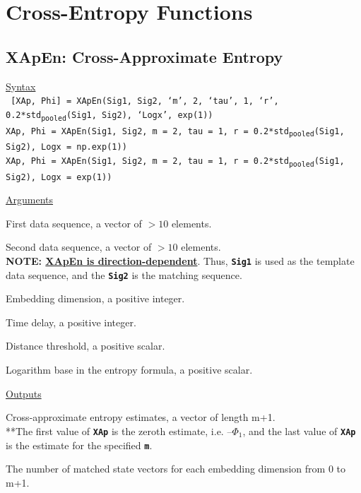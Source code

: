\documentclass[12pt, a4paper, titlepage, openany]{book}
\begin{document}
\newpage
\section{Cross-Entropy Functions}
\vspace{1cm}

\subsection{\normalsize XApEn: \hspace{15mm} Cross-Approximate Entropy}\label{XApEn}
\noindent\ul{Syntax} \vspace{6mm} \\ \noindent \texttt{\footnotesize
[XAp, Phi] = XApEn(Sig1, Sig2, ‘m’, 2, ‘tau’, 1, ‘r’, 0.2*std\textsubscript{pooled}(Sig1, Sig2), ‘Logx’, exp(1))\\
 XAp, Phi  = XApEn(Sig1, Sig2, m = 2, tau = 1, r = 0.2*std\textsubscript{pooled}(Sig1, Sig2), Logx = np.exp(1))\\
 XAp, Phi  = XApEn(Sig1, Sig2, m = 2, tau = 1, r = 0.2*std\textsubscript{pooled}(Sig1, Sig2), Logx = exp(1))}

\noindent \ul{Arguments}
\begin{description}[labelsep=1cm, labelwidth=2cm, nosep,,style=multiline,leftmargin=3cm]\footnotesize
\item[\texttt{Sig1}]	First data sequence, a vector of $>10$ elements.
\item[\texttt{Sig2}]	Second data sequence, a vector of $>10$ elements.\\
\textbf{NOTE: \ul{XApEn is direction-dependent}}. Thus, \texttt{\textbf{Sig1}} is used as the template data sequence, and the \texttt{\textbf{Sig2}} is the matching sequence.
\item[\texttt{m}]		Embedding dimension, a positive integer.
\item[\texttt{tau}]		Time delay, a positive integer.
\item[\texttt{r}]		Distance threshold, a positive scalar.
\item[\texttt{Logx}]	Logarithm base in the entropy formula, a positive scalar.
\end{description}

\noindent \ul{Outputs}
\begin{description}[labelsep=1cm, labelwidth=2cm, nosep, style=multiline,leftmargin=3cm]\footnotesize
\item[\texttt{XAp}]		Cross-approximate entropy estimates, a vector of length m+1.\\
		**The first value of \texttt{\textbf{XAp}} is the zeroth estimate, i.e. $– \Phi_1$, and the last value of \texttt{\textbf{XAp}} is the estimate for the specified \texttt{\textbf{m}}.
\item[\texttt{Phi}]		The number of matched state vectors for each embedding dimension from 0 to m+1.
\end{description}
\end{document}
